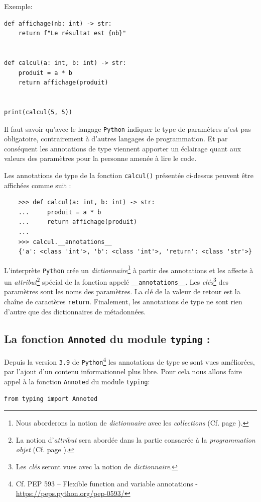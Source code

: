 \documentclass[a4paper,12pt]{book}
\begin{document}
Exemple: 
\begin{lstlisting}[caption=Les annotations de type]
def affichage(nb: int) -> str:
    return f"Le résultat est {nb}"


def calcul(a: int, b: int) -> str:
    produit = a * b
    return affichage(produit)


print(calcul(5, 5))
\end{lstlisting}
\medskip

Il faut savoir qu'avec le langage \texttt{Python} indiquer le type de paramètres n'est pas obligatoire, contrairement à d'autres langages de programmation. Et par conséquent les annotations de type viennent apporter un éclairage quant aux valeurs des paramètres pour la personne amenée à lire le code.
\medskip

Les annotations de type de la fonction \texttt{calcul()} présentée ci-dessus peuvent être affichées comme suit :
\begin{verbatim}
    >>> def calcul(a: int, b: int) -> str:
    ...     produit = a * b
    ...     return affichage(produit)
    ... 
    >>> calcul.__annotations__
    {'a': <class 'int'>, 'b': <class 'int'>, 'return': <class 'str'>}
\end{verbatim}
\medskip

L'interprète \texttt{Python} crée un \textit{dictionnaire}\footnote{Nous aborderons la notion de \textit{dictionnaire} avec les \textit{collections} (Cf. page \pageref{les_dictionnaires}).} à partir des annotations et les affecte à un \textit{attribut}\footnote{La notion d'\textit{attribut} sera abordée dans la partie consacrée à la \textit{programmation objet} (Cf. page \pageref{POO}).} spécial de la fonction appelé \texttt{\_\_annotations\_\_}. Les \textit{clés}\footnote{Les \textit{clés} seront vues avec la notion de \textit{dictionnaire}.} des paramètres sont les noms des paramètres. La clé de la valeur de retour est la chaîne de caractères \texttt{return}. Finalement, les annotations de type ne sont rien d'autre que des dictionnaires de métadonnées.
\medskip

\subsection*{La fonction \texttt{Annoted} du module \texttt{typing} : }
Depuis la version \texttt{3.9} de \texttt{Python}\footnote{Cf. PEP 593 – Flexible function and variable annotations - \url{https://peps.python.org/pep-0593/}} les annotations de type se sont vues améliorées, par l'ajout d'un contenu informationnel plus libre. Pour cela nous allons faire appel à la fonction \texttt{Annoted} du module \texttt{typing}:
\begin{lstlisting}[caption=Import de la fonction \texttt{Annoted}]
from typing import Annoted
\end{lstlisting}
\medskip
\end{document}
